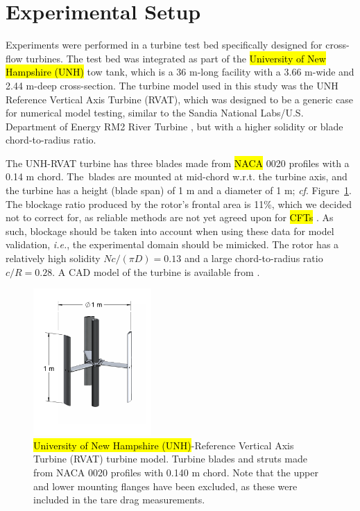 \documentclass[energies,article,accept,moreauthors,pdftex,10pt,a4paper]{mdpi}
\theoremstyle{mdpi}
\newcounter{ex}
\newcounter{re}
\begin{document}
\section{Experimental Setup}

Experiments were performed in a turbine test bed specifically designed for
cross-flow turbines. The test bed was integrated as part of the \hl {University of New Hampshire (UNH)} 
 tow tank,
which is a 36 m-long facility with a 3.66 m-wide and 2.44 m-deep cross-section.
The turbine model used in this study was the UNH Reference Vertical Axis Turbine
(RVAT), which was designed to be a generic case for numerical model testing,
similar to the Sandia National Labs/U.S. Department of Energy RM2%
 River Turbine
\cite{Neary2014}, but with a higher solidity or blade chord-to-radius ratio.

The UNH-RVAT turbine has three blades made from \hl {NACA} 0020 profiles
  with a 0.14 m
chord. The~blades are mounted at mid-chord w.r.t. the turbine axis, and the
turbine has a height (blade span) of 1 m and a diameter of 1 m; \textit{cf}.
Figure~\ref{fig:turbine}. The blockage ratio produced by the rotor's frontal
area is 11\%, which we decided not to correct for, as reliable methods are
not yet agreed upon for \hl {CFTs} %
\cite{Cavagnaro2014}. As such, blockage should be
taken into account when using these data for model validation, \emph{i.e.}, the
experimental domain should be mimicked. The rotor has a relatively high solidity
$Nc/(\pi D) = 0.13$ and a large chord-to-radius ratio $c/R = 0.28$. A CAD model of
the turbine is available from \cite{Bachant2014-RVAT-CAD}.

\begin{figure}[H]
\centering

\includegraphics[width=0.4\textwidth]{figures/turbine}

\caption{\hl {University of New Hampshire (UNH)}-Reference Vertical Axis Turbine (RVAT) turbine model. Turbine blades and struts made from NACA 0020
 profiles with 0.140 m chord. Note that the upper and lower mounting flanges have
 been excluded, as these were included in the tare drag measurements.}

\label{fig:turbine}
\end{figure}
\end{document}
